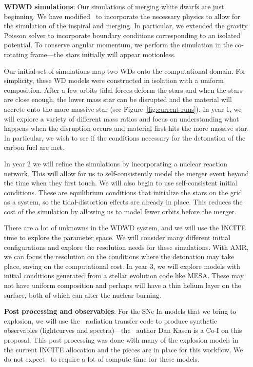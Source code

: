 {\bf WDWD simulations}: Our simulations of merging white dwarfs are just
beginning.  We have modified \castro\ to incorporate the necessary physics
to allow for the simulation of the inspiral and merging.  In particular,
we extended the gravity Poisson solver to incorporate boundary conditions 
corresponding to an isolated potential.  To conserve angular momentum, 
we perform the simulation in the co-rotating frame---the
stars initially will appear motionless.

Our initial set of simulations map two WDs onto the computational
domain.  For simplicity, these WD models were constructed in isolation
with a uniform composition.  After a few orbits tidal forces
deform the stars and when the stars are close enough, the lower mass
star can be disrupted and the material will accrete onto the more
massive star (see Figure~\ref{fig:current-runs}).  In year 1, we will explore
a variety of different mass ratios and focus on understanding what happens
when the disruption occurs and material first hits the more massive star.
In particular, we wish to see if the conditions necessary for the detonation
of the carbon fuel are met.

In year 2 we will refine the simulations by incorporating a nuclear
reaction network.  This will allow for us to self-consistently model
the merger event beyond the time when they first touch.  We will also
begin to use self-consistent initial conditions.  These are
equilibrium conditions that initialize the stars on the grid as a
system, so the tidal-distortion effects are already in place.  This
reduces the cost of the simulation by allowing us to model fewer orbits
before the merger.

There are a lot of unknowns in the WDWD system, and we will use the
INCITE time to explore the parameter space.  We will consider many
different initial configurations and explore the resolution needs for
these simulations.  With AMR, we can focus the resolution on the
conditions where the detonation may take place, saving on the
computational cost.  In year 3, we will explore models with initial
conditions generated from a stellar evolution code like MESA.  These
may not have uniform composition and perhaps will have a thin helium
layer on the surface, both of which can alter the nuclear burning.


{\bf Post processing and observables}:  
%
For the SNe Ia models that we bring to explosion, we will use the
\sedona\ radiation transfer code to produce synthetic observables
(lightcurves and spectra)---the \sedona\ author Dan Kasen is a Co-I on
this proposal.  This post processing was done with many of the explosion 
models in the current INCITE allocation and the pieces are in place for this
workflow. We do not expect \sedona\ to require a lot of compute
time for these models.


